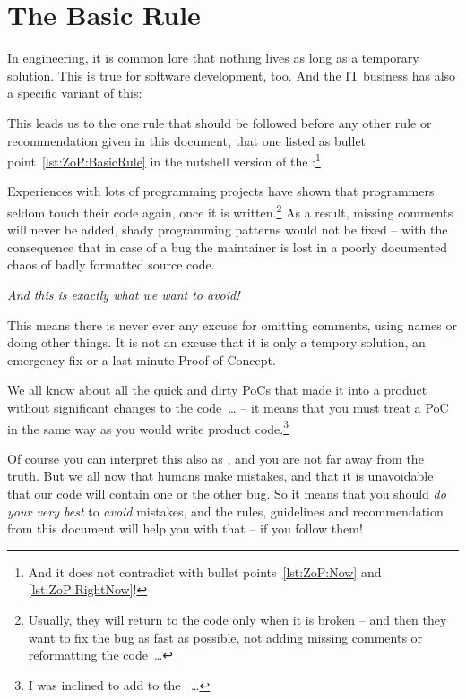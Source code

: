 \section{The Basic Rule}\label{sec:TheBasicRule}
In engineering, it is common lore that nothing lives as long as a temporary solution. This is true for software development, too. And the IT business has also a specific variant of this: 

This leads us to the one rule that should be followed before any other rule or recommendation given in this document, that one listed as bullet point~\ref{lst:ZoP:BasicRule} in the nutshell version of the \ngref:\footnote{And it does not contradict with bullet points~\ref{lst:ZoP:Now} and \ref{lst:ZoP:RightNow}!}

\begin{center}
	\begin{huge}
	\end{huge}
\end{center}

Experiences with lots of programming projects have shown that programmers seldom touch their code again, once it is written.\footnote{Usually, they will return to the code only when it is broken – and then they want to fix the bug as fast as possible, not adding missing comments or reformatting the code~…} As a result, missing comments will never be added, shady programming patterns would not be fixed – with the consequence that in case of a bug the maintainer is lost in a poorly documented chaos of badly formatted source code.

\textit{And this is exactly what we want to avoid!} 

This means there is never ever any excuse for omitting comments, using  names or doing other  things. It is not an excuse that it is only a tempory solution, an emergency fix or a last minute Proof of Concept.

We all know about all the quick and dirty PoCs that made it into a product without significant changes to the code~… – it means that you must treat a PoC in the same way as you would write product code.\footnote{I was inclined to add  to the \ngref~…}

Of course you can interpret this also as , and you are not far away from the truth. But we all now that humans make mistakes, and that it is unavoidable that our code will contain one or the other bug. So it means that you should \textit{do your very best} to \textit{avoid} mistakes, and the rules, guidelines and recommendation from this document will help you with that – if you follow them!

